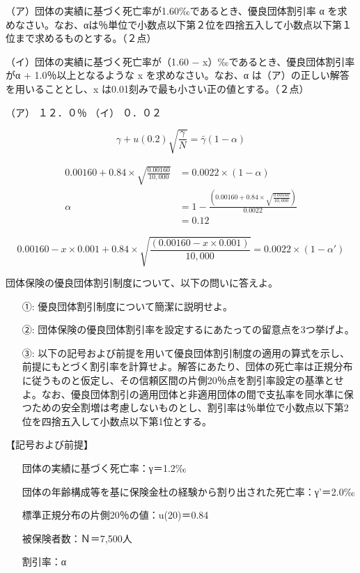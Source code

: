 \documentclass[report,gutter=10mm,fore-edge=10mm,uplatex,dvipdfmx]{jlreq}
\begin{document}
（ア）団体の実績に基づく死亡率が1.60‰であるとき、優良団体割引率 α を求めなさい。なお、αは％単位で小数点以下第２位を四捨五入して小数点以下第１位まで求めるものとする。（２点）

（イ）団体の実績に基づく死亡率が（1.60 − x）‰であるとき、優良団体割引率がα + 1.0％以上となるような x を求めなさい。なお、α は（ア）の正しい解答を用いることとし、x は0.01刻みで最も小さい正の値とする。（２点）

\answer{}
（ア） １２．０％ （イ） ０．０２

$$
\gamma+u(0.2)\sqrt{\frac{\gamma}{N}} = \bar{\gamma}(1-\alpha)
$$

\begin{align*}
0.00160 + 0.84 \times \sqrt{\frac{0.00160}{10,000}} & = 0.0022\times(1-\alpha)\\
\alpha & = 1 - \frac{(0.00160+0.84\times\sqrt{\frac{0.00160}{10,000}})}{0.0022}\\
&=0.12
\end{align*}

$$
0.00160 - x\times 0.001 + 0.84 \times \sqrt{\frac{(0.00160-x\times 0.001)}{10,000}}  = 0.0022\times(1-\alpha')
$$


団体保険の優良団体割引制度について、以下の問いに答えよ。

\begin{itemize}
\item[ ①: ]  優良団体割引制度について簡潔に説明せよ。
\item[ ②: ]  団体保険の優良団体割引率を設定するにあたっての留意点を3つ挙げよ。
\item[ ③: ]  以下の記号および前提を用いて優良団体割引制度の適用の算式を示し、前提にもとづく割引率を計算せよ。解答にあたり、団体の死亡率は正規分布に従うものと仮定し、その信頼区間の片側20％点を割引率設定の基準とせよ。なお、優良団体割引の適用団体と非適用団体の間で支払率を同水準に保つための安全割増は考慮しないものとし、割引率は％単位で小数点以下第2位を四捨五入して小数点以下第1位とする。
\end{itemize}

【記号および前提】

\begin{itemize}
\item[] 団体の実績に基づく死亡率：γ＝1.2‰
\item[] 団体の年齢構成等を基に保険金杜の経験から割り出された死亡率：γ’＝2.0‰
\item[] 標準正規分布の片側20％の値：u(20)＝0.84
\item[] 被保険者数：Ｎ＝7,500人
\item[] 割引率：α
\end{itemize}
\answer{}
\end{document}
